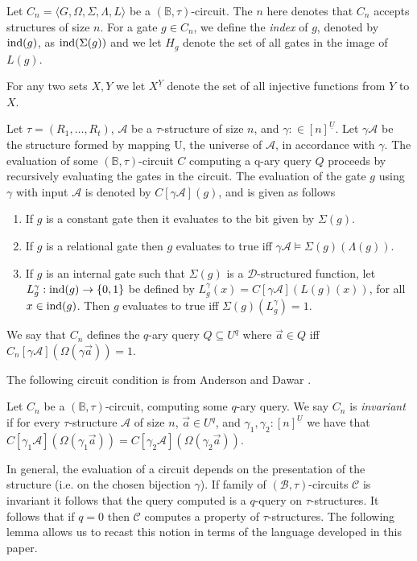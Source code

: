 \documentclass[../paper.tex]{subfiles}
\begin{document}
Let $C_n = \langle G, \Omega, \Sigma, \Lambda, L \rangle$ be a $(\mathbb{B},
\tau)$-circuit. The $n$ here denotes that $C_n$ accepts structures of size $n$.
For a gate $g \in C_n$, we define the \emph{index} of $g$, denoted by $\text{\upshape ind}(g)$,
as $\text{\upshape ind}(\Sigma(g))$ and we let $H_g$ denote the set of all gates in the image
of $L(g)$.

For any two sets $X, Y$ we let $X^{\underline{Y}}$ denote the set of all
injective functions from $Y$ to $X$.

Let $\tau = (R_1, \ldots , R_t)$, $\mathcal{A}$ be a $\tau$-structure of size
$n$, and $\gamma: \in [n]^{\underline{U}}$. Let $\gamma \mathcal{A}$ be the
structure formed by mapping U, the universe of $\mathcal{A}$, in accordance with
$\gamma$. The evaluation of some $(\mathbb{B}, \tau)$-circuit $C$ computing a
q-ary query $Q$ proceeds by recursively evaluating the gates in the circuit. The
evaluation of the gate $g$ using $\gamma$ with input $\mathcal{A}$ is denoted by
$C[\gamma \mathcal{A}](g)$, and is given as follows
\begin{enumerate}
  \setlength\itemsep{0mm}
\item If $g$ is a constant gate then it evaluates to the bit given by
  $\Sigma(g)$.
\item If $g$ is a relational gate then $g$ evaluates to true iff $\gamma
  \mathcal{A} \models \Sigma(g)(\Lambda (g))$.
\item If $g$ is an internal gate such that $\Sigma (g)$ is a
  $\mathcal{D}$-structured function, let $L^{\gamma}_g: \text{\upshape ind}(g) \rightarrow
  \{0,1\}$ be defined by $L^{\gamma}_g(x) = C[\gamma \mathcal{A}](L(g)(x))$, for
  all $x \in \text{\upshape ind}(g)$. Then $g$ evaluates to true iff $\Sigma(g) (L^{\gamma}_g)
  = 1$.
\end{enumerate}
We say that $C_n$ defines the $q$-ary query $Q \subseteq U^q$ where $\vec{a} \in
Q$ iff $C_n[\gamma \mathcal{A}](\Omega (\gamma \vec{a})) = 1$.


The following circuit condition is from Anderson and Dawar \cite{AndersonD17}.

\begin{definition}
  Let $C_n$ be a $(\mathbb{B}, \tau)$-circuit, computing some $q$-ary query. We
  say $C_n$ is \emph{invariant} if for every $\tau$-structure $\mathcal{A}$ of
  size $n$, $\vec{a} \in U^{q}$, and $\gamma_1, \gamma_2: [n]^{\underline{U}}$
  we have that $C[\gamma_1 \mathcal{A}](\Omega (\gamma_1 \vec{a})) = C[\gamma_2
  \mathcal{A}](\Omega (\gamma_2 \vec{a}))$.
\end{definition}
In general, the evaluation of a circuit depends on the presentation of the
structure (i.e. on the chosen bijection $\gamma$). If family of $(\mathcal{B},
\tau)$-circuits $\mathcal{C}$ is invariant it follows that the query computed is
a $q$-query on $\tau$-structures. It follows that if $q = 0$ then $\mathcal{C}$
computes a property of $\tau$-structures. The following lemma allows us to
recast this notion in terms of the language developed in this paper.
\end{document}
